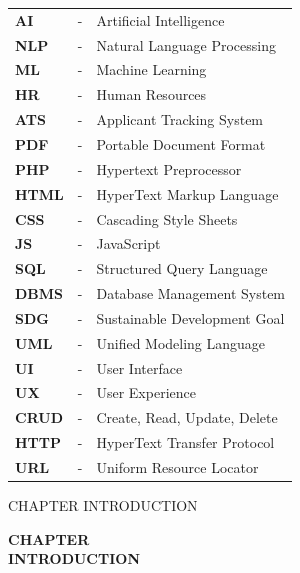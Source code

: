 \documentclass[12pt,a4paper]{report}
\newcommand{\chaptertitlepage}[1]{%
    \clearpage
    \thispagestyle{empty}
    \vspace*{\fill}
    \begin{center}
        {\bfseries\large CHAPTER \thechapter}\\[20pt]
        {\bfseries\large #1}
    \end{center}
    \vspace*{\fill}
    \clearpage
}
\begin{document}
\begin{tabular}{p{3cm} p{0.5cm} p{11cm}}

\textbf{AI}      & - & Artificial Intelligence \\[0.2cm]
\textbf{NLP}     & - & Natural Language Processing \\[0.2cm]
\textbf{ML}      & - & Machine Learning \\[0.2cm]
\textbf{HR}      & - & Human Resources \\[0.2cm]
\textbf{ATS}     & - & Applicant Tracking System \\[0.2cm]
\textbf{PDF}     & - & Portable Document Format \\[0.2cm]
\textbf{PHP}     & - & Hypertext Preprocessor \\[0.2cm]
\textbf{HTML}    & - & HyperText Markup Language \\[0.2cm]
\textbf{CSS}     & - & Cascading Style Sheets \\[0.2cm]
\textbf{JS}      & - & JavaScript \\[0.2cm]
\textbf{SQL}     & - & Structured Query Language \\[0.2cm]
\textbf{DBMS}    & - & Database Management System \\[0.2cm]
\textbf{SDG}     & - & Sustainable Development Goal \\[0.2cm]
\textbf{UML}     & - & Unified Modeling Language \\[0.2cm]
\textbf{UI}      & - & User Interface \\[0.2cm]
\textbf{UX}      & - & User Experience \\[0.2cm]
\textbf{CRUD}    & - & Create, Read, Update, Delete \\[0.2cm]
\textbf{HTTP}    & - & HyperText Transfer Protocol \\[0.2cm]
\textbf{URL}     & - & Uniform Resource Locator \\[0.2cm]

\end{tabular}

\clearpage


{CHAPTER \thechapter\quad INTRODUCTION}

\chaptertitlepage{INTRODUCTION}

\setcounter{page}{2}
\pagestyle{maincontent}
\end{document}
